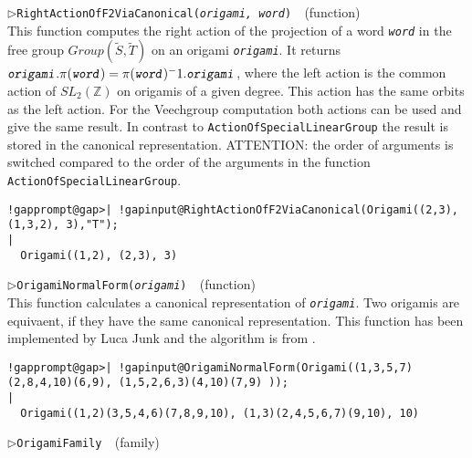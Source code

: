 \documentclass[a4paper,11pt]{report}
\begin{document}
{{{\begin{Verbatim}[commandchars=!@|,fontsize=\small,frame=single,label=Example]
\end{Verbatim}
 \noindent\textcolor{FuncColor}{$\triangleright$\enspace\texttt{RightActionOfF2ViaCanonical({\mdseries\slshape origami, word})
\label{RightActionOfF2ViaCanonical}
}\hfill{\scriptsize (function)}}\\


 This function computes the right action of the projection of a word \mbox{\texttt{\mdseries\slshape word}} in the free group $Group(\tilde{S}, \tilde{T})$ on an origami \mbox{\texttt{\mdseries\slshape origami}}. It returns $\mbox{\texttt{\mdseries\slshape origami}}.\pi(\mbox{\texttt{\mdseries\slshape word}}) = \pi(\mbox{\texttt{\mdseries\slshape word}})^-1.\mbox{\texttt{\mdseries\slshape origami}}$, where the left action is the common action of $SL_2(\mathbb{Z})$ on origamis of a given degree. This action has the same orbits as the left
action. For the Veechgroup computation both actions can be used and give the
same result. In contrast to \texttt{ActionOfSpecialLinearGroup} the result is stored in the canonical representation. ATTENTION: the order of
arguments is switched compared to the order of the arguments in the function \texttt{ActionOfSpecialLinearGroup}. 
\begin{Verbatim}[commandchars=!@|,fontsize=\small,frame=single,label=Example]
  !gapprompt@gap>| !gapinput@RightActionOfF2ViaCanonical(Origami((2,3), (1,3,2), 3),"T");
|
  Origami((1,2), (2,3), 3)
\end{Verbatim}
 \noindent\textcolor{FuncColor}{$\triangleright$\enspace\texttt{OrigamiNormalForm({\mdseries\slshape origami})
\label{OrigamiNormalForm}
}\hfill{\scriptsize (function)}}\\


 This function calculates a canonical representation of \mbox{\texttt{\mdseries\slshape  origami}}. Two origamis are equivaent, if they have the same canonical representation.
This function has been implemented by Luca Junk and the algorithm is from \cite{ONF}. 
\begin{Verbatim}[commandchars=!@|,fontsize=\small,frame=single,label=Example]
  !gapprompt@gap>| !gapinput@OrigamiNormalForm(Origami((1,3,5,7)(2,8,4,10)(6,9), (1,5,2,6,3)(4,10)(7,9) ));
|
  Origami((1,2)(3,5,4,6)(7,8,9,10), (1,3)(2,4,5,6,7)(9,10), 10)
\end{Verbatim}
 \noindent\textcolor{FuncColor}{$\triangleright$\enspace\texttt{OrigamiFamily
\label{OrigamiFamily}
}\hfill{\scriptsize (family)}}\\


}}}
\end{document}
